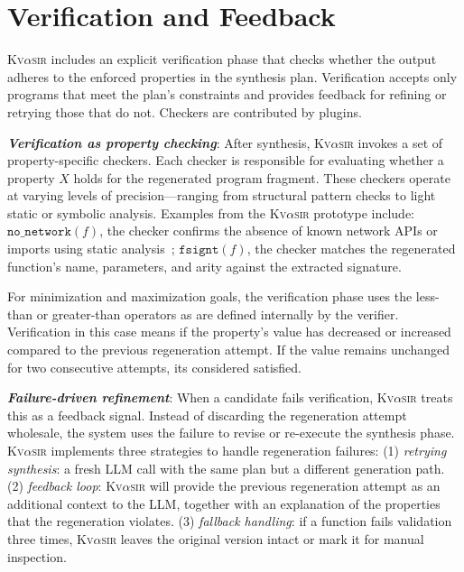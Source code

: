 \documentclass[nonacm,sigplan,review]{acmart}
\newcommand{\sys}{{\scshape Kv{$\alpha$}sir}\xspace}
\newcommand{\heading}[1]{\vspace{2pt}\noindent\textbf{\emph{#1}}:\enspace}
\newcommand{\ttt}[1]{\texttt{#1}\xspace}
\begin{document}
\section{Verification and Feedback}
\label{sec:verification}

\sys includes an explicit verification phase that checks whether the output adheres to the enforced properties in the synthesis plan. 
Verification accepts only programs that meet the plan's constraints and
provides feedback for refining or retrying those that do not.
Checkers are contributed by plugins.

\heading{Verification as property checking}
After synthesis, \sys invokes a set of property-specific checkers.
Each checker
is responsible for evaluating whether a property $X$ holds
for the regenerated program fragment.
These checkers operate at varying levels
of precision---ranging from structural pattern checks to light static or
symbolic analysis.
Examples from the \sys prototype include:
  $\ttt{no\_network}(f)$, the checker confirms the absence of known network APIs or imports using static analysis~\cite{mir:ccs:2021};
  $\ttt{fsignt}(f)$, the checker matches the regenerated function's name, parameters, and arity against the extracted signature.

For minimization and maximization goals, the verification phase uses the less-than or greater-than operators as are defined internally by the verifier.
Verification in this case means if the property's value has decreased or increased compared 
to the previous regeneration attempt.
If the value remains unchanged for two consecutive attempts, its considered satisfied.

\heading{Failure-driven refinement}
When a candidate fails verification, \sys treats this as a feedback signal. Instead of discarding the regeneration attempt wholesale, the system uses the failure to revise or re-execute the synthesis phase.
\sys implements three strategies to handle regeneration failures:
  (1) \emph{retrying synthesis}: a fresh LLM call with the same plan but a different generation path.
  (2) \emph{feedback loop}: \sys will provide the previous regeneration attempt 
    as an additional context to the LLM, together with an explanation of the properties that the regeneration violates.
  (3) \emph{fallback handling}: if a function fails validation three times, \sys leaves the original version intact or mark it for manual inspection.

\end{document}
